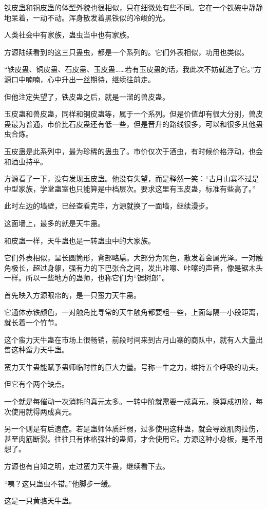 \begin{this_body}
铁皮蛊和铜皮蛊的体型外貌也很相似，只在细微处有些不同。它在一个铁碗中静静地呆着，一动不动。浑身散发着黑铁似的冷峻的光。

人类社会中有家族，蛊虫当中也有家族。

方源陆续看到的这三只蛊虫，都是一个系列的。它们外表相似，功用也类似。

“铁皮蛊、铜皮蛊、石皮蛊、玉皮蛊……若有玉皮蛊的话，我此次不妨就选了它。”方源口中喃喃，心中升出一丝期待，继续往前走。

但他注定失望了，铁皮蛊之后，就是一溜的兽皮蛊。

玉皮蛊和兽皮蛊，同样和铜皮蛊等，属于一个系列。但是价值却有很大分别，兽皮蛊最为普通，市价比石皮蛊还有低一些，但是晋升的路线很多，可以和很多其他蛊虫合炼。

玉皮蛊是此系列中，最为珍稀的蛊虫了。市价仅次于酒虫，有时候价格浮动，也会和酒虫持平。

方源看了一下，没有发现玉皮蛊。他没有失望，而是释然一笑：“古月山寨不过是中型家族，学堂蛊室也只能算是中档层次。要求这里有玉皮蛊，标准有些高了。”

此时左边的墙壁，已经查看完毕，方源就换了一面墙，继续漫步。

这面墙上，最多的就是天牛蛊。

和皮蛊一样，天牛蛊也是一转蛊虫中的大家族。

它们外表相似，呈长圆筒形，背部略扁。大部分为黑色，散发着金属光泽。一对触角极长，超过身躯，强有力的下巴张合之间，发出咔嚓、咔嚓的声音，像是锯木头一样。所以一些地方的蛊师，也称它们为“锯树郎”。

首先映入方源眼帘的，是一只蛮力天牛蛊。

它通体赤铁颜色，一对触角比寻常的天牛触角都要粗一些，上面每隔一小段距离，就长着一个竹节。

这个蛮力天牛蛊在市场上很畅销，前段时间来到古月山寨的商队中，就有人大量出售这种蛮力天牛蛊。

蛮力天牛蛊能赋予蛊师临时性的巨大力量。号称一牛之力，维持五个呼吸的功夫。

但它有个两个缺点。

一个就是每催动一次消耗的真元太多。一转中阶就需要一成真元，换算成初阶，每次使用就得两成真元。

另一个则是有后遗症。若是蛊师体质纤弱，过多使用这种蛊，就会导致肌肉拉伤，甚至肉筋断裂。往往只有体格强壮的蛊师，才会使用它。方源这种小身板，是不用想了。

方源也有自知之明，走过蛮力天牛蛊，继续看下去。

“咦？这只蛊虫不错。”他脚步一缓。

这是一只黄骆天牛蛊。


\end{this_body}
